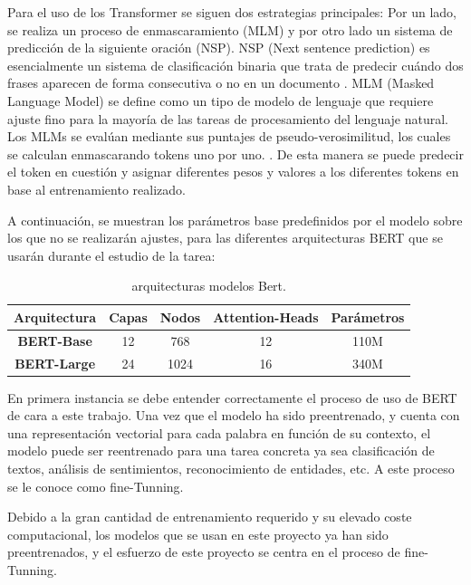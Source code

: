 Para el uso de los Transformer se siguen dos estrategias principales: Por un lado, se realiza un proceso de enmascaramiento (MLM) y por otro lado un sistema de predicción de la siguiente oración (NSP). NSP (Next sentence prediction) es esencialmente un sistema de clasificación binaria que trata de predecir cuándo dos frases aparecen de forma consecutiva o no en un documento \cite{sun-etal-2022-nsp}. MLM (Masked Language Model) se define como un tipo de modelo de lenguaje que requiere ajuste fino para la mayoría de las tareas de procesamiento del lenguaje natural. Los MLMs se evalúan mediante sus puntajes de pseudo-verosimilitud, los cuales se calculan enmascarando tokens uno por uno. \cite{salazar2019masked}. De esta manera se puede predecir el token en cuestión y asignar diferentes pesos y valores a los diferentes tokens en base al entrenamiento realizado.

A continuación, se muestran los parámetros base predefinidos por el modelo sobre los que no se realizarán ajustes, para las diferentes arquitecturas BERT que se usarán durante el estudio de la tarea:

\begin{table}[H]
\begin{center}
\begin{tabular} {|c|c|c|c|c|}
\hline
\rowcolor[HTML]{C0C0C0} 
\textbf{Arquitectura}& \textbf{Capas} & \textbf{Nodos} & \textbf{Attention-Heads} & \textbf{Parámetros} \\ \hline
\cellcolor[HTML]{C0C0C0}\textbf{BERT-Base} & 12 & 768 & 12 & 110M \\ \hline
\cellcolor[HTML]{C0C0C0}\textbf{BERT-Large} & 24 & 1024 & 16 & 340M \\ \hline
\end{tabular}
\end{center}
\label{fig:bert-arch}
\caption{arquitecturas modelos Bert.}
\label{tab:arch-bert}
\end{table}


En primera instancia se debe entender correctamente el proceso de uso de BERT de cara a este trabajo. Una vez que el modelo ha sido preentrenado, y cuenta con una representación vectorial para cada palabra en función de su contexto, el modelo puede ser reentrenado para una tarea concreta ya sea clasificación de textos, análisis de sentimientos, reconocimiento de entidades, etc. A este proceso se le conoce como fine-Tunning. 

Debido a la gran cantidad de entrenamiento requerido y su elevado coste computacional, los modelos que se usan en este proyecto ya han sido preentrenados, y el esfuerzo de este proyecto se centra en el proceso de fine-Tunning. 

